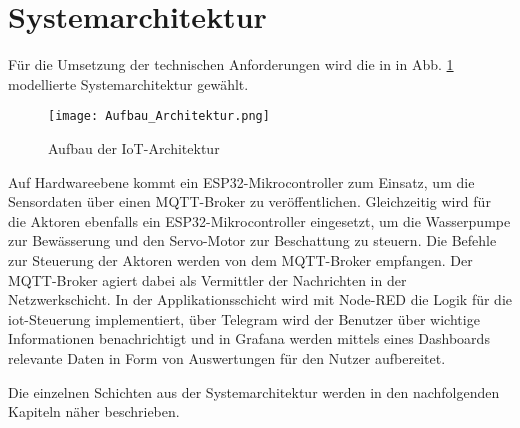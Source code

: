 \section{Systemarchitektur} \label{sec:architektur}

Für die Umsetzung der technischen Anforderungen wird die in in Abb. \ref{fig:iotschichten} modellierte Systemarchitektur gewählt.

\begin{figure}[h]
  \centering
  \texttt{[image: Aufbau\_Architektur.png]}
  \caption{Aufbau der IoT-Architektur}\label{fig:iotschichten}
\end{figure}

Auf Hardwareebene kommt ein ESP32-Mikrocontroller zum Einsatz, um die Sensordaten über einen MQTT-Broker zu veröffentlichen. Gleichzeitig wird für die Aktoren ebenfalls ein ESP32-Mikrocontroller eingesetzt, um die Wasserpumpe zur Bewässerung und den Servo-Motor zur Beschattung zu steuern. Die Befehle zur Steuerung der Aktoren werden von dem MQTT-Broker empfangen. Der MQTT-Broker agiert dabei als Vermittler der Nachrichten in der Netzwerkschicht. In der Applikationsschicht wird mit Node-RED die Logik für die \gls{iot}-Steuerung implementiert, über Telegram wird der Benutzer über wichtige Informationen benachrichtigt und in Grafana werden mittels eines Dashboards relevante Daten in Form von Auswertungen für den Nutzer aufbereitet.

Die einzelnen Schichten aus der Systemarchitektur werden in den nachfolgenden Kapiteln näher beschrieben.